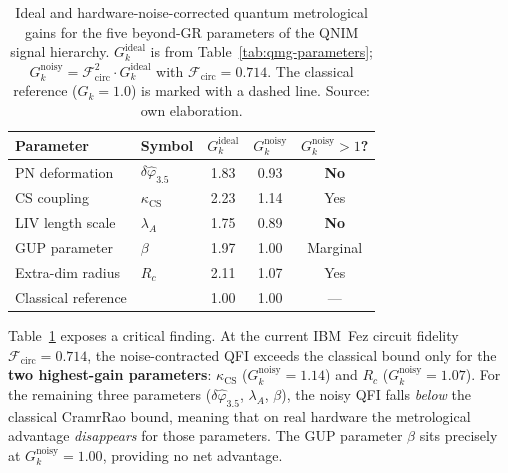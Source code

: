 \documentclass[11pt,a4paper, english]{book}
\theoremstyle{plain}
\theoremstyle{definition}
\numberwithin{equation}{chapter}
\numberwithin{figure}{chapter}
\numberwithin{table}{chapter}
\begin{document}
\begin{table}[ht]
\centering
\begin{tabular}{@{}llccc@{}}
\toprule
\textbf{Parameter} & \textbf{Symbol}
  & $G_k^\mathrm{ideal}$
  & $G_k^\mathrm{noisy}$
  & $G_k^\mathrm{noisy} > 1$? \\
\midrule
PN deformation  & $\delta\hat{\varphi}_{3.5}$ & 1.83 & 0.93 & \textbf{No} \\
CS coupling     & $\kappa_\mathrm{CS}$          & 2.23 & 1.14 & Yes \\
LIV length scale & $\lambda_A$                 & 1.75 & 0.89 & \textbf{No} \\
GUP parameter   & $\beta$                       & 1.97 & 1.00 & Marginal \\
Extra-dim radius & $R_c$                        & 2.11 & 1.07 & Yes \\
\midrule
Classical reference &               & 1.00 & 1.00 & --- \\
\bottomrule
\end{tabular}
\caption[Ideal vs noise-corrected quantum gains]{Ideal and hardware-noise-corrected quantum metrological gains
         for the five beyond-GR parameters of the QNIM signal hierarchy.
         $G_k^\mathrm{ideal}$ is from Table~\ref{tab:qmg-parameters};
         $G_k^\mathrm{noisy} = \mathcal{F}_\mathrm{circ}^2 \cdot
         G_k^\mathrm{ideal}$ with $\mathcal{F}_\mathrm{circ} = 0.714$.
         The classical reference ($G_k = 1.0$) is marked with a dashed line. Source: own elaboration.}
\label{tab:qmg-noisy}
\vspace{2pt}
\normalsize

\end{table}

Table~\ref{tab:qmg-noisy} exposes a critical finding.
At the current IBM~Fez circuit fidelity $\mathcal{F}_\mathrm{circ} = 0.714$,
the noise-contracted QFI exceeds the classical bound only for the
\textbf{two highest-gain parameters}:
$\kappa_\mathrm{CS}$ ($G_k^\mathrm{noisy} = 1.14$) and
$R_c$ ($G_k^\mathrm{noisy} = 1.07$).
For the remaining three parameters ($\delta\hat{\varphi}_{3.5}$,
$\lambda_A$, $\beta$), the noisy QFI falls \emph{below} the
classical CramrRao bound, meaning that on real hardware the
metrological advantage \emph{disappears} for those parameters.
The GUP parameter $\beta$ sits precisely at $G_k^\mathrm{noisy} = 1.00$,
providing no net advantage.
\end{document}
